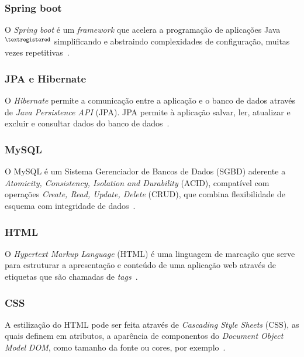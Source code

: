 \subsubsection{Spring boot}

O\textit{ Spring boot} é um \textit{framework} que acelera a programação de aplicações Java$^{\tiny{\textregistered}}$ simplificando e abstraindo complexidades de configuração, muitas vezes repetitivas~\cite{bianchi2015sistema}.

\subsubsection{JPA e Hibernate}

O \textit{Hibernate} permite a comunicação entre a aplicação e o banco de dados através de \textit{Java Persistence API} (JPA).
JPA permite à aplicação salvar, ler, atualizar e excluir e consultar dados do banco de dados~\cite{gonccalves2007desenvolvendo}.

\subsubsection{MySQL}

O MySQL é um Sistema Gerenciador de Bancos de Dados (SGBD) aderente a \textit{Atomicity, Consistency, Isolation and Durability} (ACID), compatível com operações \textit{Create, Read, Update, Delete} (CRUD), que combina flexibilidade de esquema com integridade de dados~\cite{mysql2018}.


\subsubsection{HTML}

O \textit{Hypertext Markup Language} (HTML) é uma linguagem de marcação que serve para estruturar a apresentação e conteúdo de uma aplicação web através de etiquetas que são chamadas de \textit{tags}~\cite{agustin2015model}.

\subsubsection{CSS}

A estilização do HTML pode ser feita através de \textit{Cascading Style Sheets} (CSS), as quais definem em atributos, a aparência de componentos do \textit{Document Object Model} \textit{DOM}, como tamanho da fonte ou cores, por exemplo~\cite{abreu2016desenvolvimento}.

